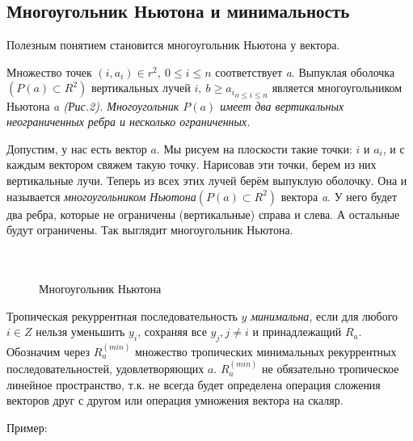 \documentclass[russian]{lecture-notes}
\begin{document}
\subsection{Многоугольник Ньютона и минимальность}

Полезным понятием становится
многоугольник Ньютона у вектора.
\begin{Definition}
Множество точек $(i,a_i)\in r^2,\:0\leq i\leq n$ соответствует {\itshape a}. Выпуклая оболочка $(P(a)\subset R^2)$ вертикальных лучей ${{i,\:b\geq a_i}}_{o\leq i\leq n}$ является многоугольником Ньютона
\itshape a\upshape \; (Рис.2). Многоугольник $P(a)$ имеет два вертикальных неограниченных ребра и несколько
ограниченных.
\end{Definition}
Допустим, у нас есть вектор $a$.
Мы рисуем на плоскости такие точки: $i$ и $a_i$, и
с каждым вектором свяжем такую точку.
Нарисовав эти точки,
берем из них вертикальные лучи.
Теперь из всех этих лучей берём выпуклую оболочку.
Она и называется \emph{многоугольником Ньютона}$(P(a)\subset R^2)$ вектора {\itshape a}. У него будет два ребра, которые не ограничены (вертикальные) справа и слева. А остальные будут ограничены. Так выглядит многоугольник Ньютона.
\\\\\\

\begin{figure}[h!]
\caption{Многоугольник Ньютона}
\end{figure}
\begin{Definition}
	Тропическая рекуррентная последовательность $y$ \emph{минимальна}, если для любого $i\in Z$ нельзя уменьшить $y_i$, сохраняя все $y_j,j\neq i$ и принадлежащий $R_a$. Обозначим через $R_a^{(min)}$ множество тропических минимальных рекуррентных последовательностей, удовлетворяющих $a$.\; $R_a^{(min)}$ не обязательно тропическое линейное пространство, т.к. не всегда будет определена операция сложения векторов друг с другом или операция умножения вектора на скаляр.
\end{Definition}
Пример:
\end{document}
